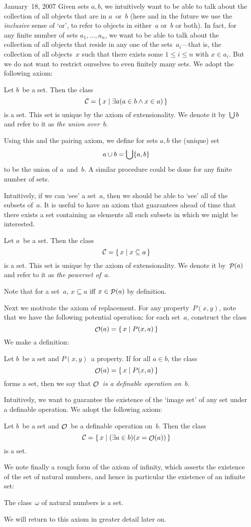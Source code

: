 \begin{lecture}{January~18, 2007}
Given sets \(a,b\), we intuitively want to be able to talk about the collection of all objects that are in \(a\)~or~\(b\) (here and in the future we use the \emph{inclusive} sense of `or', to refer to objects in either~\(a\) or~\(b\) or both). In fact, for any finite number of sets \(a_1,\ldots,a_n\), we want to be able to talk about the collection of all objects that reside in any one of the sets~\(a_i\)---that is, the collection of all objects~\(x\) such that there exists some \(1\le i\le n\) with \(x\in a_i\). But we do not want to restrict ourselves to even finitely many sets. We adopt the following axiom:
\begin{axm}[Union]
Let \(b\)~be a set. Then the class
\[\mathcal{C}=\{\,x\mid\exists a(a\in b\land x\in a)\,\}\]
is a set. This set is unique by the axiom of extensionality. We denote it by~\(\bigcup b\) and refer to it as \emph{the union over~\(b\)}.
\end{axm}
\noindent Using this and the pairing axiom, we define for sets \(a,b\) the (unique) set
\[a\cup b=\bigcup\{a,b\}\]
to be the union of \(a\)~and~\(b\). A similar procedure could be done for any finite number of sets.

Intuitively, if we can `see' a set~\(a\), then we should be able to `see' all of the subsets of~\(a\). It is useful to have an axiom that guarantees ahead of time that there exists a set containing as elements all such subsets in which we might be interested.
\begin{axm}[Powerset]
Let \(a\)~be a set. Then the class
\[\mathcal{C}=\{\,x\mid x\subseteq a\,\}\]
is a set. This set is unique by the axiom of extensionality. We denote it by~\(\mathop{\mathcal{P}}(a)\) and refer to it as \emph{the powerset of~\(a\)}.
\end{axm}
\noindent Note that for a set~\(a\), \(x\subseteq a\) iff \(x\in\mathop{\mathcal{P}}(a)\) by definition.

Next we motivate the axiom of replacement. For any property~\(P(x,y)\), note that we have the following potential operation: for each set~\(a\), construct the class
\[\mathop{\mathcal{O}}\nolimits(a)=\{\,x\mid P(x,a)\,\}\]
We make a definition:
\begin{defn}
Let \(b\)~be a set and \(P(x,y)\)~a property. If for all \(a\in b\), the class
\[\mathop{\mathcal{O}}\nolimits(a)=\{\,x\mid P(x,a)\,\}\]
forms a set, then we say that \emph{\(\mathop{\mathcal{O}}\nolimits\)~is a definable operation on~\(b\)}.
\end{defn}
\noindent Intuitively, we want to guarantee the existence of the `image set' of any set under a definable operation. We adopt the following axiom:
\begin{axm}
Let \(b\)~be a set and \(\mathop{\mathcal{O}}\nolimits\)~be a definable operation on~\(b\). Then the class
\[\mathcal{C}=\{\,x\mid(\exists a\in b)(x=\mathop{\mathcal{O}}\nolimits(a))\,\}\]
is a set.
\end{axm}

We note finally a rough form of the axiom of infinity, which asserts the existence of the set of natural numbers, and hence in particular the existence of an infinite set:
\begin{axm}[Infinity]
The class~\(\omega\) of natural numbers is a set.
\end{axm}
\noindent We will return to this axiom in greater detail later on.
\end{lecture}
